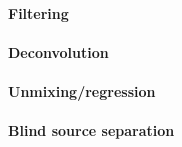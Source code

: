 \paragraph{Filtering}


\paragraph{Deconvolution}

\paragraph{Unmixing/regression}

\paragraph{Blind source separation}



